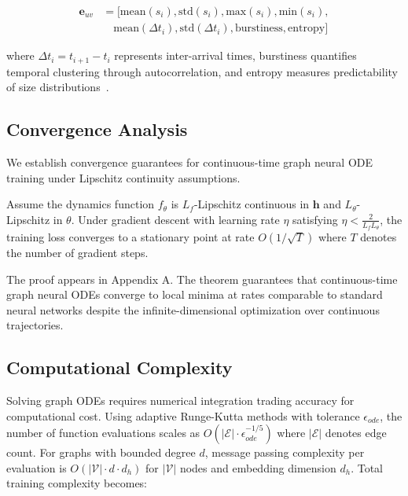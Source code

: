 \begin{align}
\mathbf{e}_{uv} &= [\text{mean}(s_i), \text{std}(s_i), \text{max}(s_i), \text{min}(s_i), \\
&\quad \text{mean}(\Delta t_i), \text{std}(\Delta t_i), \text{burstiness}, \text{entropy}]
\end{align}

where $\Delta t_i = t_{i+1} - t_i$ represents inter-arrival times, burstiness quantifies temporal clustering through autocorrelation, and entropy measures predictability of size distributions~\cite{anderson2017tls}.

\subsection{Convergence Analysis}

We establish convergence guarantees for continuous-time graph neural ODE training under Lipschitz continuity assumptions.

\begin{theorem}
\label{thm:cttgnn_convergence}
Assume the dynamics function $f_\theta$ is $L_f$-Lipschitz continuous in $\mathbf{h}$ and $L_\theta$-Lipschitz in $\theta$. Under gradient descent with learning rate $\eta$ satisfying $\eta < \frac{2}{L_f L_\theta}$, the training loss converges to a stationary point at rate $O(1/\sqrt{T})$ where $T$ denotes the number of gradient steps.
\end{theorem}

The proof appears in Appendix A. The theorem guarantees that continuous-time graph neural ODEs converge to local minima at rates comparable to standard neural networks despite the infinite-dimensional optimization over continuous trajectories.

\subsection{Computational Complexity}

Solving graph ODEs requires numerical integration trading accuracy for computational cost. Using adaptive Runge-Kutta methods with tolerance $\epsilon_{ode}$, the number of function evaluations scales as $O(|\mathcal{E}| \cdot \epsilon_{ode}^{-1/5})$ where $|\mathcal{E}|$ denotes edge count. For graphs with bounded degree $d$, message passing complexity per evaluation is $O(|\mathcal{V}| \cdot d \cdot d_h)$ for $|\mathcal{V}|$ nodes and embedding dimension $d_h$. Total training complexity becomes:

